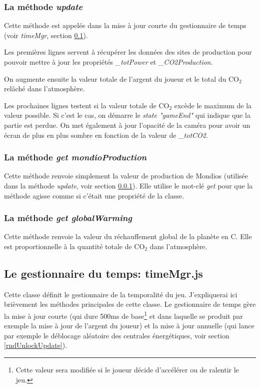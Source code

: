 \documentclass{article}
\begin{document}
		\subsubsection{La méthode \textit{update}}\label{prodUpdate}
		Cette méthode est appelée dans la mise à jour courte du gestionnaire de temps (voir \textit{timeMgr}, section \ref{timeMgr}).
		
		
		Les premières lignes servent à récupérer les données des sites de production pour pouvoir mettre à jour les propriétés \textit{\_totPower} et \textit{\_CO2Production}. 
		
		
		On augmente ensuite la valeur totale de l'argent du joueur et le total du CO$_{2}$ relâché dans l'atmosphère.
		
		
		Les prochaines lignes testent si la valeur totale de CO$_{2}$ excède le maximum de la valeur possible. Si c'est le cas, on démarre le \textit{state "gameEnd"} qui indique que la partie est perdue. On met également à jour l'opacité de la caméra pour avoir un écran de plus en plus sombre en fonction de la valeur de \textit{\_totCO2}.
		
		\subsubsection{La méthode \textit{get mondioProduction}} \label{mondioProduction}
		Cette méthode renvoie simplement la valeur de production de Mondios (utilisée dans la méthode \textit{update}, voir section \ref{prodUpdate}). Elle utilise le mot-clé \textit{get} pour que la méthode agisse comme si c'était une propriété de la classe.
		
		\subsubsection{La méthode \textit{get globalWarming}} \label{globalWarming}
		Cette méthode renvoie la valeur du réchauffement global de la planète en \degree C. Elle est proportionnelle à la quantité totale de CO$_{2}$ dans l'atmosphère.
		
		\subsection{Le gestionnaire du temps: timeMgr.js} \label{timeMgr}
		
		
		Cette classe définit le gestionnaire de la temporalité du jeu. J'expliquerai ici brièvement les méthodes principales de cette classe. Le gestionnaire de temps gère la mise à jour courte (qui dure 500ms de base\footnote{Cette valeur sera modifiée si le joueur décide d'accélérer ou de ralentir le jeu.} et dans laquelle se produit par exemple la mise à jour de l'argent du joueur) et la mise à jour annuelle (qui lance par exemple le déblocage aléatoire des centrales énergétiques, voir section \ref{rndUnlockUpdate}).
		
\end{document}
